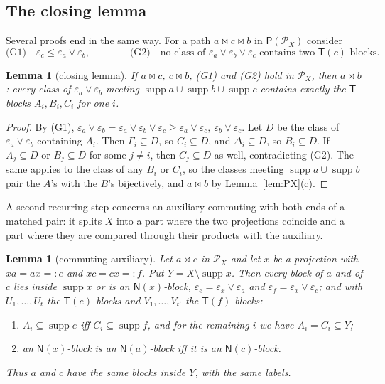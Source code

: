 \documentclass[11pt]{amsart}
\newtheorem{lemma}[theorem]{Lemma}
\theoremstyle{definition}
\renewcommand{\P}{\mathcal{P}}      %
\newcommand{\PA}{\mathsf{P}}         %
\newcommand{\supp}{\operatorname{supp}}
\newcommand{\T}{\mathsf{T}}
\newcommand{\N}{\mathsf{N}}
\newcommand{\mt}{\bowtie}      %
\begin{document}
\subsection{The closing lemma}\label{subsec:closing}

Several proofs end in the same way. For a path $a\mt c\mt b$ in $\PA(\P_X)$ consider
\[
\text{(G1)}\quad \varepsilon_c\le\varepsilon_a\vee\varepsilon_b,\qquad\qquad \text{(G2)}\quad\text{no class of }\varepsilon_a\vee\varepsilon_b\vee\varepsilon_c\text{ contains two }\T(c)\text{-blocks.}
\]

\begin{lemma}[closing lemma]\label{lem:closing}
If $a\mt c$, $c\mt b$, \textup{(G1)} and \textup{(G2)} hold in $\P_X$, then $a\mt b$: every class of $\varepsilon_a\vee\varepsilon_b$ meeting $\supp a\cup\supp b\cup\supp c$ contains exactly the $\T$-blocks $A_i,B_i,C_i$ for one $i$.
\end{lemma}

\begin{proof}
By (G1), $\varepsilon_a\vee\varepsilon_b=\varepsilon_a\vee\varepsilon_b\vee\varepsilon_c\ge\varepsilon_a\vee\varepsilon_c,\ \varepsilon_b\vee\varepsilon_c$. Let $D$ be the class of $\varepsilon_a\vee\varepsilon_b$ containing $A_i$. Then $\Gamma_i\subseteq D$, so $C_i\subseteq D$, and $\Delta_i\subseteq D$, so $B_i\subseteq D$. If $A_j\subseteq D$ or $B_j\subseteq D$ for some $j\ne i$, then $C_j\subseteq D$ as well, contradicting (G2). The same applies to the class of any $B_i$ or $C_i$, so the classes meeting $\supp a\cup\supp b$ pair the $A$'s with the $B$'s bijectively, and $a\mt b$ by Lemma~\ref{lem:PX}(c).
\end{proof}

A second recurring step concerns an auxiliary commuting with both ends of a matched pair: it splits $X$ into a part where the two projections coincide and a part where they are compared through their products with the auxiliary.

\begin{lemma}[commuting auxiliary]\label{lem:commaux}
Let $a\mt c$ in $\P_X$ and let $x$ be a projection with $xa=ax=:e$ and $xc=cx=:f$. Put $Y=X\setminus\supp x$. Then every block of $a$ and of $c$ lies inside $\supp x$ or is an $\N(x)$-block, $\varepsilon_e=\varepsilon_x\vee\varepsilon_a$ and $\varepsilon_f=\varepsilon_x\vee\varepsilon_c$; and with $U_1,\dots,U_t$ the $\T(e)$-blocks and $V_1,\dots,V_{t'}$ the $\T(f)$-blocks:
\begin{enumerate}[label=\textup{(\alph*)}]
\item $A_i\subseteq\supp e$ iff $C_i\subseteq\supp f$, and for the remaining $i$ we have $A_i=C_i\subseteq Y$;
\item an $\N(x)$-block is an $\N(a)$-block iff it is an $\N(c)$-block.
\end{enumerate}
Thus $a$ and $c$ have the same blocks inside $Y$, with the same labels.
\end{lemma}
\end{document}
